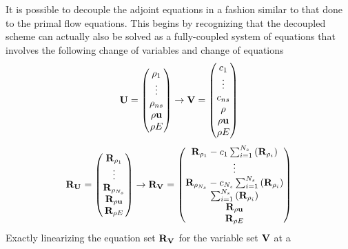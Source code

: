 It is possible to decouple the adjoint equations in a fashion similar to that
done to the primal flow equations.  This begins by recognizing that the
decoupled scheme can actually also be solved as a fully-coupled system of
equations that involves the following change of variables and change of
equations
\begin{equation}
  \mathbf U = \begin{pmatrix}
    \rho_1 \\
    \vdots \\
    \rho_{ns} \\
    \rho \mathbf u \\
    \rho E
  \end{pmatrix}
  \rightarrow
  \mathbf V = \begin{pmatrix}
    c_1 \\
    \vdots \\
    c_{ns} \\
    \rho \\
    \rho \mathbf u \\
    \rho E
  \end{pmatrix}
  \label{u-v-vars}
\end{equation}
\begin{equation}
  \mathbf R_{{\mathbf U}_{}} =
  \begin{pmatrix}
    \mathbf R_{\rho_1} \\
    \vdots \\
    \mathbf R_{\rho_{N_s}} \\
    \mathbf R_{\rho \mathbf u} \\
    \mathbf R_{\rho E}
  \end{pmatrix}
  \rightarrow
  \mathbf R_{{\mathbf V}_{}} =
  \begin{pmatrix}
    \mathbf R_{\rho_1} - c_1 \sum_{i=1}^{N_s}\left(\mathbf R_{\rho_i}\right) \\
    \vdots \\
    \mathbf R_{\rho_{N_s}} - c_{N_s} \sum_{i=1}^{N_s}\left(\mathbf R_{\rho_i}\right) \\
    \sum_{i=1}^{N_s}\left(\mathbf R_{\rho_i}\right) \\
    \mathbf R_{\rho \mathbf u} \\
    \mathbf R_{\rho E}
  \end{pmatrix}
  \label{fc-to-dc-res}
\end{equation}
Exactly linearizing the equation set $\mathbf R_{{\mathbf V}_{}}$ for the variable set $\mathbf V$ at a
